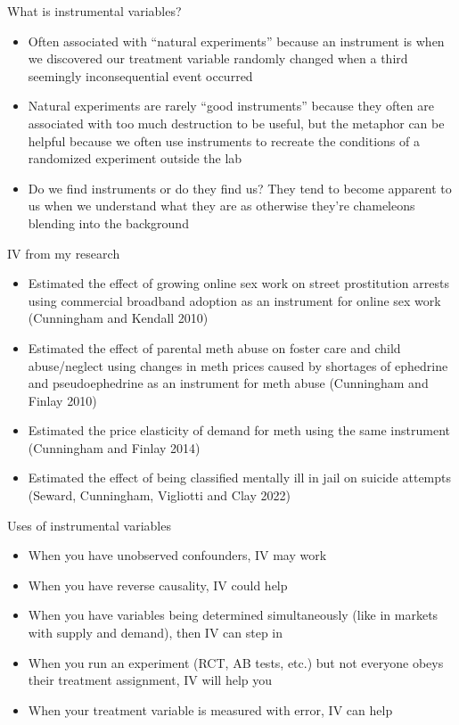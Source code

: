 \documentclass{beamer}
\begin{document}
\begin{frame}{What is instrumental variables?}

\begin{itemize}
\item Often associated with ``natural experiments'' because an instrument is when we discovered our treatment variable randomly changed when a third seemingly inconsequential event occurred
\item Natural experiments are rarely ``good instruments'' because they often are associated with too much destruction to be useful, but the metaphor can be helpful because we often use instruments to recreate the conditions of a randomized experiment outside the lab
\item Do we find instruments or do they find us?  They tend to become apparent to us when we understand what they are as otherwise they're chameleons blending into the background

\end{itemize}

\end{frame}



	
\begin{frame}{IV from my research}

\begin{itemize}
\item Estimated the effect of growing online sex work on street prostitution arrests using commercial broadband adoption as an instrument for online sex work (Cunningham and Kendall 2010)
\item Estimated the effect of parental meth abuse on foster care and child abuse/neglect using changes in meth prices caused by shortages of ephedrine and pseudoephedrine as an instrument for meth abuse (Cunningham and Finlay 2010)
\item Estimated the price elasticity of demand for meth using the same instrument (Cunningham and Finlay 2014)
\item Estimated the effect of being classified mentally ill in jail on suicide attempts (Seward, Cunningham, Vigliotti and Clay 2022)
\end{itemize}

\end{frame}

\begin{frame}{Uses of instrumental variables}

\begin{itemize}
\item When you have unobserved confounders, IV may work
\item When you have reverse causality, IV could help
\item When you have variables being determined simultaneously (like in markets with supply and demand), then IV can step in
\item When you run an experiment (RCT, AB tests, etc.) but not everyone obeys their treatment assignment, IV will help you
\item When your treatment variable is measured with error, IV can help
\end{itemize}

\end{frame}
\end{document}
